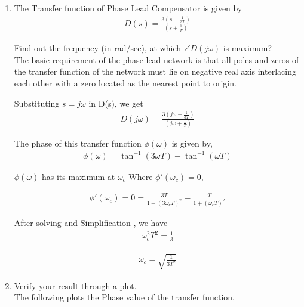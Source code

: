 \begin{enumerate}[label=\thesection.\arabic*.,ref=\thesection.\theenumi]
\item 
The Transfer function of Phase Lead Compensator is given by \\

\begin{align}
D(s) = \frac{3(s+\frac{1}{3T})}{(s+\frac{1}{T})}
\end{align}

Find out the frequency (in rad/sec), at which $\angle D(j\omega)$ is maximum? \\
\label{prob:ee18btech11010_comp}
\solution
The basic requirement of the phase lead network is that all poles and zeros
of the transfer function of the network must lie on negative real axis
interlacing each other with a zero located as the nearest point to origin.

Substituting $s = j\omega$ in D(s), we get \\

\begin{align}
D(j\omega) = \frac{3(j\omega+\frac{1}{3T})}{(j\omega+\frac{1}{T})}
\end{align}

The phase of this transfer function $\phi(\omega)$ is given by,
\begin{align}
\phi(\omega) = \tan^{-1}(3\omega T)-\tan^{-1}(\omega T)
\end{align}

$\phi(\omega)$ has its maximum at $\omega_c$ Where $\phi '(\omega_c)=0$,

\begin{align}
\phi '(\omega_c) = 0 = \frac{3T}{1+(3\omega _c T)^2}-\frac{T}{1+(\omega _c T)^2}
\end{align}

After solving and Simplification , we have \\

\begin{align}
\omega _c ^2T^2 = \frac{1}{3}
\end{align}

\begin{align}
\omega _c = \sqrt{\frac{1}{3T^2}}
\end{align}

\item Verify your result through a plot.
\\
\solution 
The following plots the Phase value of the transfer function, 


\end{enumerate}
